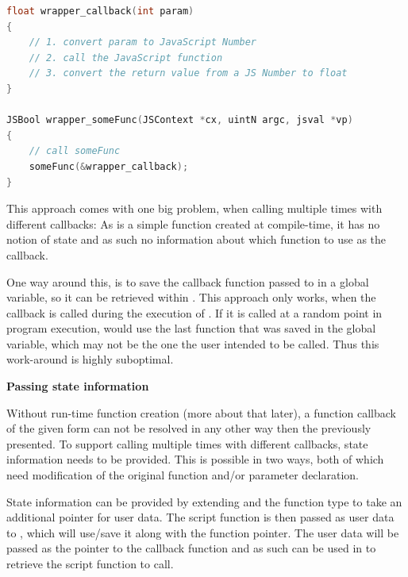 \SingleSpacing
\begin{lstlisting}[language=C++, caption=Wrapper code for handling methods that take function pointers \#1]
float wrapper_callback(int param)
{
	// 1. convert param to JavaScript Number
	// 2. call the JavaScript function
	// 3. convert the return value from a JS Number to float
}

JSBool wrapper_someFunc(JSContext *cx, uintN argc, jsval *vp)
{
	// call someFunc
	someFunc(&wrapper_callback);
}
\end{lstlisting}
\OnehalfSpacing

This approach comes with one big problem, when calling  multiple times with different  callbacks: As  is a simple  function created at compile-time, it has no notion of state and as such no information about which  function to use as the callback.

One way around this, is to save the  callback function passed to \linebreak{} in a global variable, so it can be retrieved within . This approach only works, when the callback is called during the execution of . If it is called at a random point in program execution,  would use the last  function that was saved in the global variable, which may not be the one the user intended to be called. Thus this work-around is highly suboptimal.

\textbf{Passing state information}

Without run-time function creation (more about that later), a function callback of the given form can not be resolved in any other way then the previously presented. To support calling  multiple times with different callbacks, state information needs to be provided. This is possible in two ways, both of which need modification of the original function and/or parameter declaration.

State information can be provided by extending  and the function type to take an additional  pointer for user data. The script function is then passed as user data to , which will use/save it along with the function pointer. The user data will be passed as the  pointer to the  callback function and as such can be used in  to retrieve the script function to call.

